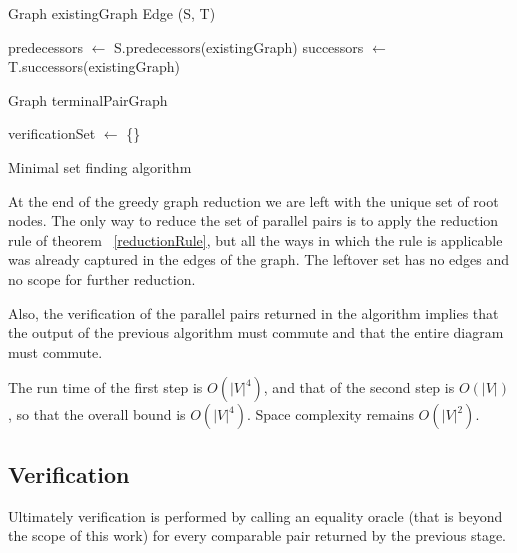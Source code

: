 \documentclass[sigplan,review,nonacm=true]{acmart}
\begin{document}
\begin{algorithm}
\DontPrintSemicolon
{}
Graph existingGraph\;
Edge (S, T)\;
        
predecessors $\gets$ S.predecessors(existingGraph)\;
successors $\gets$ T.successors(existingGraph)\;

Graph terminalPairGraph\;

verificationSet $\gets$ \{\}\;
\;
\caption{Minimal set finding algorithm}
\label{algo_online_minimal}
\end{algorithm}

At the end of the greedy graph reduction we are left with the unique set of root nodes.
The only way to reduce the set of parallel pairs is to apply the reduction rule of theorem ~\ref{reductionRule}, but all the ways in which the rule is applicable was already captured in the edges of the graph. The leftover set has no edges and no scope for further reduction.

Also, the verification of the parallel pairs returned in the algorithm implies that the output of the previous algorithm must commute and that the entire diagram must commute.

The run time of the first step is $O(|V|^4)$, and that of the second step is $O(|V|)$, so that the overall bound is $O(|V|^4)$.
Space complexity remains $O(|V|^2)$.

\subsection{Verification}
Ultimately verification is performed by calling an equality oracle (that is beyond the scope of this work) for every comparable pair returned by the previous stage.
\end{document}

